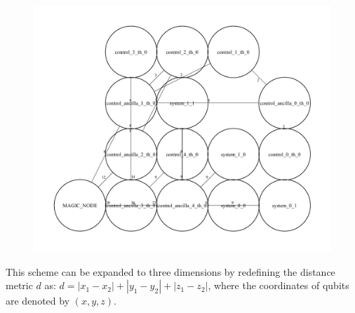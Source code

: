 \documentclass[a4paper,11pt]{ltjsarticle}
\begin{document}
{{        \begin{figure}[h]
            \centering
            \includegraphics[scale=0.40]{figure/final_state.pdf}
            \vspace{0pt}\caption{}
            \label{final_state}
            \vspace{-10pt}
        \end{figure}

        This scheme can be expanded to three dimensions by redefining the distance metric $d$ as: $d = |x_1 - x_2| + |y_1 - y_2| + |z_1 - z_2|$, where the coordinates of qubits are denoted by $(x, y, z)$.
    }
}
\end{document}
